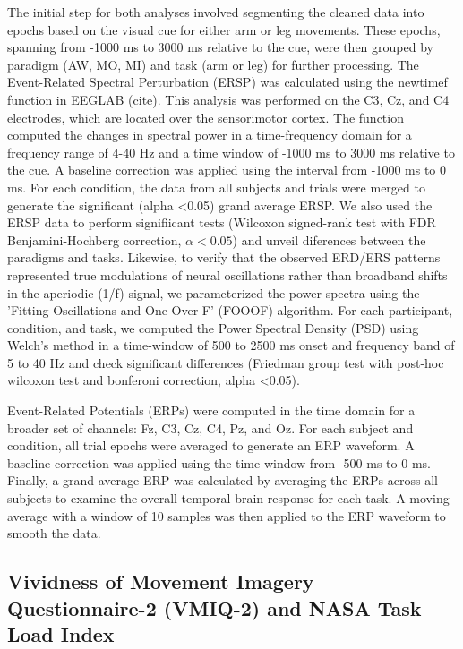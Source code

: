 \documentclass[10pt,letterpaper]{article}
\begin{document}
The initial step for both analyses involved segmenting the cleaned data into epochs based on the visual cue for either arm or leg movements. These epochs, spanning from -1000 ms to 3000 ms relative to the cue, were then grouped by paradigm (AW, MO, MI) and task (arm or leg) for further processing. The Event-Related Spectral Perturbation (ERSP) was calculated using the newtimef function in EEGLAB (cite). This analysis was performed on the C3, Cz, and C4 electrodes, which are located over the sensorimotor cortex. The function computed the changes in spectral power in a time-frequency domain for a frequency range of 4-40 Hz and a time window of -1000 ms to 3000 ms relative to the cue. A baseline correction was applied using the interval from -1000 ms to 0 ms. For each condition, the data from all subjects and trials were merged to generate the significant (alpha <0.05) grand average ERSP. We also used the ERSP data to perform signifiicant tests (Wilcoxon signed-rank test with FDR Benjamini-Hochberg correction, $\alpha <0.05$) and unveil diferences between the paradigms and tasks. Likewise, to verify that the observed ERD/ERS patterns represented true modulations of neural oscillations rather than broadband shifts in the aperiodic (1/f) signal, we parameterized the power spectra using the 'Fitting Oscillations and One-Over-F' (FOOOF) algorithm. For each participant, condition, and task, we computed the Power Spectral Density (PSD) using Welch's method in a time-window of 500 to 2500 ms onset and frequency band of 5 to 40 Hz and check significant differences (Friedman group test with post-hoc wilcoxon test and bonferoni correction, alpha <0.05).

Event-Related Potentials (ERPs) were computed in the time domain for a broader set of channels: Fz, C3, Cz, C4, Pz, and Oz. For each subject and condition, all trial epochs were averaged to generate an ERP waveform. A baseline correction was applied using the time window from -500 ms to 0 ms. Finally, a grand average ERP was calculated by averaging the ERPs across all subjects to examine the overall temporal brain response for each task. A moving average with a window of 10 samples was then applied to the ERP waveform to smooth the data.


\subsection*{Vividness of Movement Imagery Questionnaire-2 (VMIQ-2) and NASA Task Load Index}
\end{document}
